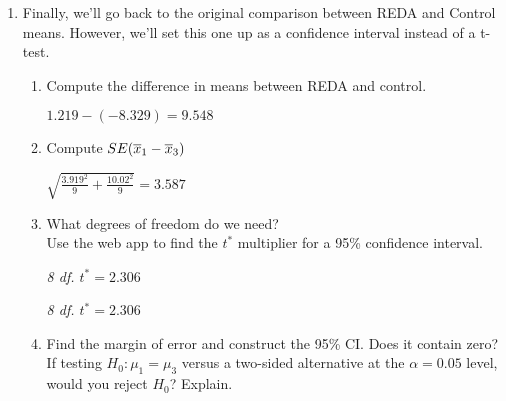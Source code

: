 \begin{enumerate}
 \item Finally, we'll go back to the original comparison between REDA
   and Control means. However, we'll set this one up as a confidence
   interval instead of a t-test. 
   \begin{enumerate}
   \item Compute the difference in means between REDA and control.
\begin{students}
    \vspace{1cm}    
\end{students}

\begin{key}
  {\it  $1.219-( -8.329) = 9.548 $}
\end{key}

   \item Compute  $SE(\overline{x}_1-\overline{x}_3)$
\begin{students}
    \vspace{1cm}    
\end{students}

\begin{key}
  {\it $\sqrt{ \frac{3.919^2}{9} + \frac{10.02^2}{9}}= 3.587$}
\end{key}

   \item What degrees of freedom do we need?\\
     Use the web app to find the $t^*$ multiplier for a 95\% 
     confidence interval. 
\begin{students}
    \vspace{1cm}    
\end{students}

\begin{key}
  {\it  8 df.   $t^* = 2.306 $}
\end{key}
\begin{students}
    \vspace{1cm}    
\end{students}

\begin{key}
  {\it  8 df.   $t^* = 2.306 $}
\end{key}

   \item Find the margin of error and construct the 95\% CI.  Does it
     contain zero?  If testing 
     $H_0: \mu_1 = \mu_3$ versus a two-sided alternative at the
     $\alpha = 0.05$ level, would you reject $H_0$?  Explain.
\begin{students}
    \vspace{1cm}    
\end{students}


\end{enumerate}
\end{enumerate}
